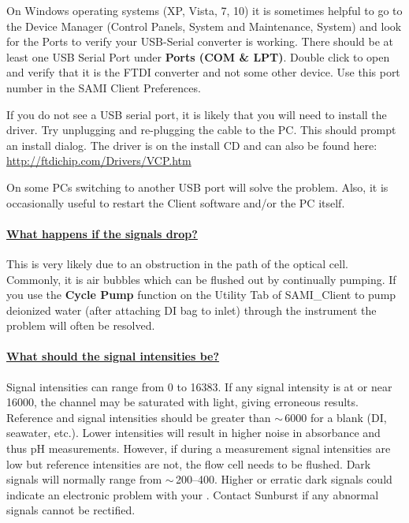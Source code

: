 On Windows operating systems (XP, Vista, 7, 10) it is sometimes helpful to go to the Device Manager (Control Panels, System and Maintenance, System) and look for the Ports to verify your USB-Serial converter is working.  There should be at least one USB Serial Port under \textbf{Ports (COM \& LPT)}. Double click to open and verify that it is the FTDI converter and not some other device.  Use this port number in the SAMI Client Preferences.

If you do not see a USB serial port, it is likely that you will need to install the driver. Try unplugging and re-plugging the cable to the PC. This should prompt an install dialog. The driver is on the install CD and can also be found here: \url{http://ftdichip.com/Drivers/VCP.htm}

On some PCs switching to another USB port will solve the problem. Also, it is occasionally useful to restart the \instType{} Client software and/or the PC itself.

\paragraph{\underline{What happens if the signals drop?}}
This is very likely due to an obstruction in the path of the optical cell. Commonly, it is air bubbles which can be flushed out by continually pumping. If you use the \textbf{Cycle Pump} function on the Utility Tab of SAMI\_Client to pump deionized water (after attaching DI bag to inlet) through the instrument the problem will often be resolved.

\paragraph{\underline{What should the signal intensities be?}}

\ifcase \inst	%

Signal intensities can range from 0 to 16383. If any signal intensity is at or near 16000, the channel may be saturated with light, giving erroneous results. Reference and signal intensities should be greater than $\sim$\,6000 for a blank (DI, seawater, etc.).  Lower intensities will result in higher noise in absorbance and thus pH measurements. However, if during a measurement signal intensities are low but reference intensities are not, the flow cell needs to be flushed. Dark signals will normally range from $\sim$\,200--400. Higher or erratic dark signals could indicate an electronic problem with your \instType{}.  Contact Sunburst if any abnormal signals cannot be rectified.

